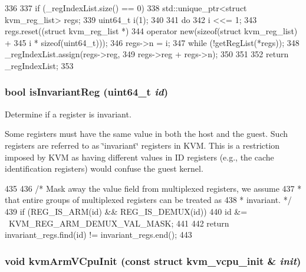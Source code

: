 \begin{DoxyCode}
336 {
337     if (_regIndexList.size() == 0) {
338         std::unique_ptr<struct kvm_reg_list> regs;
339         uint64_t i(1);
340 
341         do {
342             i <<= 1;
343             regs.reset((struct kvm_reg_list *)
344                        operator new(sizeof(struct kvm_reg_list) +
345                                     i * sizeof(uint64_t)));
346             regs->n = i;
347         } while (!getRegList(*regs));
348         _regIndexList.assign(regs->reg,
349                              regs->reg + regs->n);
350     }
351 
352     return _regIndexList;
353 }
\end{DoxyCode}
\hypertarget{classArmKvmCPU_a901923fcf22651d3f67b8c4e0874868f}{
\subsubsection[{isInvariantReg}]{\setlength{\rightskip}{0pt plus 5cm}bool isInvariantReg (uint64\_\-t {\em id})}}
\label{classArmKvmCPU_a901923fcf22651d3f67b8c4e0874868f}
Determine if a register is invariant.

Some registers must have the same value in both the host and the guest. Such registers are referred to as \char`\"{}invariant\char`\"{} registers in KVM. This is a restriction imposed by KVM as having different values in ID registers (e.g., the cache identification registers) would confuse the guest kernel. 


\begin{DoxyCode}
435 {
436     /* Mask away the value field from multiplexed registers, we assume
437      * that entire groups of multiplexed registers can be treated as
438      * invariant. */
439     if (REG_IS_ARM(id) && REG_IS_DEMUX(id))
440         id &= ~KVM_REG_ARM_DEMUX_VAL_MASK;
441 
442     return invariant_regs.find(id) != invariant_regs.end();
443 }
\end{DoxyCode}
\hypertarget{classArmKvmCPU_a019059b30bdbbd0e5b4a2e41794f5e57}{
\subsubsection[{kvmArmVCpuInit}]{\setlength{\rightskip}{0pt plus 5cm}void kvmArmVCpuInit (const struct kvm\_\-vcpu\_\-init \& {\em init})}}
\label{classArmKvmCPU_a019059b30bdbbd0e5b4a2e41794f5e57}



